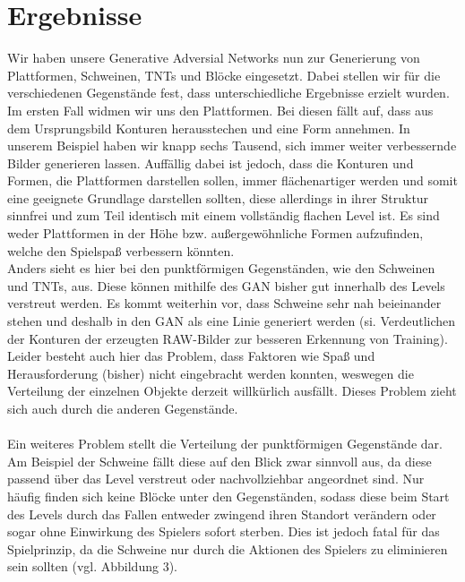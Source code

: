 
\section{Ergebnisse}
Wir haben unsere Generative Adversial Networks nun zur Generierung von Plattformen, Schweinen, TNTs und Blöcke eingesetzt. Dabei stellen wir für die verschiedenen Gegenstände fest, dass unterschiedliche Ergebnisse erzielt wurden. Im ersten Fall widmen wir uns den Plattformen. Bei diesen fällt auf, dass aus dem Ursprungsbild Konturen herausstechen und eine Form annehmen. In unserem Beispiel haben wir knapp sechs Tausend, sich immer weiter verbessernde Bilder generieren lassen. Auffällig dabei ist jedoch, dass die Konturen und Formen, die Plattformen darstellen sollen, immer flächenartiger werden und somit eine geeignete Grundlage darstellen sollten, diese allerdings in ihrer Struktur sinnfrei und zum Teil identisch mit einem vollständig flachen Level ist. Es sind weder Plattformen in der Höhe bzw. außergewöhnliche Formen aufzufinden, welche den Spielspaß verbessern könnten. \\ Anders sieht es hier bei den punktförmigen Gegenständen, wie den Schweinen und TNTs, aus. Diese können mithilfe des GAN bisher gut innerhalb des Levels verstreut werden. Es kommt weiterhin vor, dass Schweine sehr nah beieinander stehen und deshalb in den GAN als eine Linie generiert werden (si. Verdeutlichen der Konturen der erzeugten RAW-Bilder zur besseren Erkennung von Training). \\Leider besteht auch hier das Problem, dass Faktoren wie Spaß und Herausforderung (bisher) nicht eingebracht werden konnten, weswegen die Verteilung der einzelnen Objekte derzeit willkürlich ausfällt. Dieses Problem zieht sich auch durch die anderen Gegenstände. \\ \\Ein weiteres Problem stellt die Verteilung der punktförmigen Gegenstände dar. Am Beispiel der Schweine fällt diese auf den Blick zwar sinnvoll aus, da diese passend über das Level verstreut oder nachvollziehbar angeordnet sind. Nur häufig finden sich keine Blöcke unter den Gegenständen, sodass diese beim Start des Levels durch das Fallen entweder zwingend ihren Standort verändern oder sogar ohne Einwirkung des Spielers sofort sterben. Dies ist jedoch fatal für das Spielprinzip, da die Schweine nur durch die Aktionen des Spielers zu eliminieren sein sollten (vgl. Abbildung 3).
